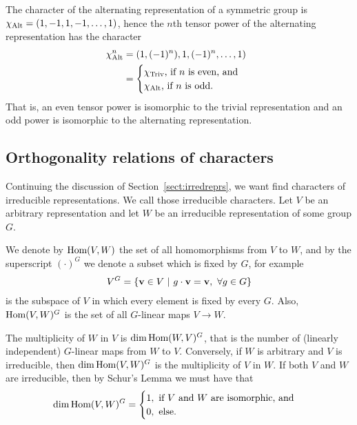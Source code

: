 \begin{example}\label{example:nthpoweralternating}
	The character of the alternating representation of a symmetric group is $\chi_{\text{Alt}} = (1, -1, 1, -1, \dots, 1)$, hence the $n$th tensor power of the alternating representation has the character
	\begin{align*}
		\chi_{\text{Alt}}^n &= (1, (-1)^n), 1, (-1)^n, \dots, 1) \\
		&= \begin{cases}
			\chi_{\text{Triv}} \text{, if $n$ is even, and } \\
			\chi_{\text{Alt}} \text{, if $n$ is odd.}
		\end{cases}
	\end{align*}
	That is, an even tensor power is isomorphic to the trivial representation and an odd power is isomorphic to the alternating representation.
\end{example}

\subsection{Orthogonality relations of characters}

Continuing the discussion of Section~\ref{sect:irredreprs}, we want find characters of irreducible representations. We call those irreducible characters. Let $V$ be an arbitrary representation and let $W$ be an irreducible representation of some group $G$. 

We denote by $\text{Hom} (V,W)$ the set of all homomorphisms from $V$ to $W$, and by the superscript $(\cdot) ^G$ we denote a subset which is fixed by $G$, for example 
\begin{align}\label{eq:defVG}
	V^G = \left\lbrace \mathbf{v} \in V \ \middle\vert \ g\cdot \mathbf{v} = \mathbf{v}, \ \forall g \in G \right\rbrace
\end{align} 
is the subspace of $V$ in which every element is fixed by every $G$. Also,  $\text{Hom}(V,W)^G$ is the set of all $G$-linear maps $V \rightarrow W$.

\begin{proposition}
	The multiplicity of $W$ in $V$ is $\dim \text{Hom}(W,V)^G$, that is the number of (linearly independent) $G$-linear maps from $W$ to $V$. Conversely, if $W$ is arbitrary and $V$ is irreducible, then $\dim \text{Hom} (V,W)^G$ is the multiplicity of $V$ in $W$. If both $V$ and $W$ are irreducible, then by Schur's Lemma we must have that
	\begin{align}\label{eq:dimhomVWG}
		\dim \text{Hom} (V,W)^G = \begin{cases}
			1, \text{ if $V$ and $W$ are isomorphic, and} \\
			0, \text{ else.}
		\end{cases}
	\end{align}
\end{proposition}

